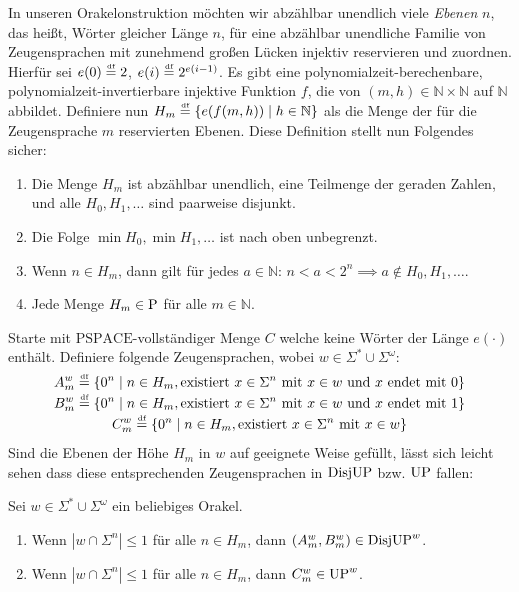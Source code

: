 
In unseren Orakelonstruktion möchten wir abzählbar unendlich viele \emph{Ebenen} $n$, das heißt, Wörter gleicher Länge $n$, für eine abzählbar unendliche Familie von Zeugensprachen mit zunehmend großen Lücken injektiv reservieren und zuordnen.
Hierfür sei $e(0) \defeq 2$, $e(i) \defeq 2^{e(i-1)}$.
Es gibt eine polynomialzeit-berechenbare, polynomialzeit-invertierbare injektive Funktion $f$, die von $(m,h)\in\mathbb N\times\mathbb N$ auf $\mathbb N$ abbildet.
Definiere nun $H_m \defeq \{ e(f(m,h)) \mid h\in\mathbb N \}$ als die Menge der für die Zeugensprache $m$ reservierten Ebenen.
Diese Definition stellt nun Folgendes sicher:
\begin{observation}\label{obs:leveldefinitions}
    \begin{enumerate}
        \item Die Menge $H_m$ ist abzählbar unendlich, eine Teilmenge der geraden Zahlen, und alle $H_0, H_1, \dots$ sind paarweise disjunkt.
        \item Die Folge $\min H_0, \min H_1, \dots$ ist nach oben unbegrenzt.
        \item Wenn $n\in H_m$, dann gilt für jedes $a\in\mathbb N$: $n<a<2^{n} \implies a\not\in H_0, H_1, \dots$.
        \item Jede Menge $H_m\in \P$ für alle $m\in\mathbb N$.
    \end{enumerate}
\end{observation}


Starte mit $\mathrm{PSPACE}$-vollständiger Menge $C$ welche keine Wörter der Länge $e(\cdot)$ enthält.
Definiere folgende Zeugensprachen, wobei $w\in\Sigma^*\cup\Sigma^{\omega}$:
\begin{gather*}
    A_m^w \defeq \{ 0^n \mid n\in H_m, \text{existiert $x\in \Sigma^{n}$ mit } x\in w \text{ und $x$ endet mit $0$} \}\\
    B_m^w \defeq \{ 0^n \mid n\in H_m, \text{existiert $x\in \Sigma^{n}$ mit } x\in w \text{ und $x$ endet mit $1$} \}\\
    C_m^w \defeq \{ 0^n \mid n\in H_m, \text{existiert $x\in \Sigma^{n}$ mit } x\in w  \}
\end{gather*}
Sind die Ebenen der Höhe $H_m$ in $w$ auf geeignete Weise gefüllt, lässt sich leicht sehen dass diese entsprechenden Zeugensprachen in $\DisjUP$ bzw. $\UP$ fallen:
\begin{claim}\label{claim:witnesslanguages}
    Sei $w\in\Sigma^*\cup\Sigma^\omega$ ein beliebiges Orakel.
    \begin{enumerate}
        \item Wenn $|w\cap \Sigma^{n}|\leq 1$ für alle $n\in H_m$, dann $(A_m^w, B_m^w)\in\DisjUP^w$.
        \item Wenn $|w\cap \Sigma^n|\leq 1$ für alle $n\in H_m$, dann $C_m^w \in \UP^w$.
    \end{enumerate}
\end{claim}

